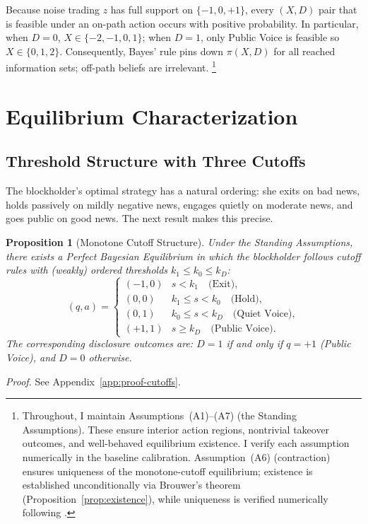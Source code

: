 \documentclass[11pt]{article}
\newtheorem{proposition}{Proposition}
\newcommand{\1}{\mathbf{1}}
\begin{document}
Because noise trading $z$ has full support on $\{-1,0,+1\}$, every $(X,D)$ pair that is feasible under an on-path action occurs with positive probability. In particular, when $D=0$, $X\in\{-2,-1,0,1\}$; when $D=1$, only Public Voice is feasible so $X\in\{0,1,2\}$. Consequently, Bayes' rule pins down $\pi(X,D)$ for all reached information sets; off-path beliefs are irrelevant.%
\footnote{Throughout, I maintain Assumptions~\textup{(A1)}--\textup{(A7)} (the Standing Assumptions). These ensure interior action regions, nontrivial takeover outcomes, and well-behaved equilibrium existence. I verify each assumption numerically in the baseline calibration. Assumption~\textup{(A6)} (contraction) ensures uniqueness of the monotone-cutoff equilibrium; existence is established unconditionally via Brouwer's theorem (Proposition~\ref{prop:existence}), while uniqueness is verified numerically following \citet{EdmansGoldsteinJiang2015}.}
\section{Equilibrium Characterization}
\label{sec:equilibrium}

%
\subsection{Threshold Structure with Three Cutoffs}
%

The blockholder's optimal strategy has a natural ordering: she exits on bad news, holds passively on mildly negative news, engages quietly on moderate news, and goes public on good news. The next result makes this precise.

\begin{proposition}[Monotone Cutoff Structure]
\label{prop:cutoffs}
Under the Standing Assumptions, there exists a Perfect Bayesian Equilibrium in which the blockholder follows cutoff rules with (weakly) ordered thresholds $k_1 \leq k_0 \leq k_D$:
\[
(q, a) = \begin{cases}
(-1, 0) & s < k_1 \quad \text{(Exit)}, \\
(0, 0) & k_1 \leq s < k_0 \quad \text{(Hold)}, \\
(0, 1) & k_0 \leq s < k_D \quad \text{(Quiet Voice)}, \\
(+1, 1) & s \geq k_D \quad \text{(Public Voice)}.
\end{cases}
\]
The corresponding disclosure outcomes are: $D = 1$ if and only if $q = +1$ (Public Voice), and $D = 0$ otherwise.
\end{proposition}
\textit{Proof.} See Appendix~\ref{app:proof-cutoffs}.
\end{document}
